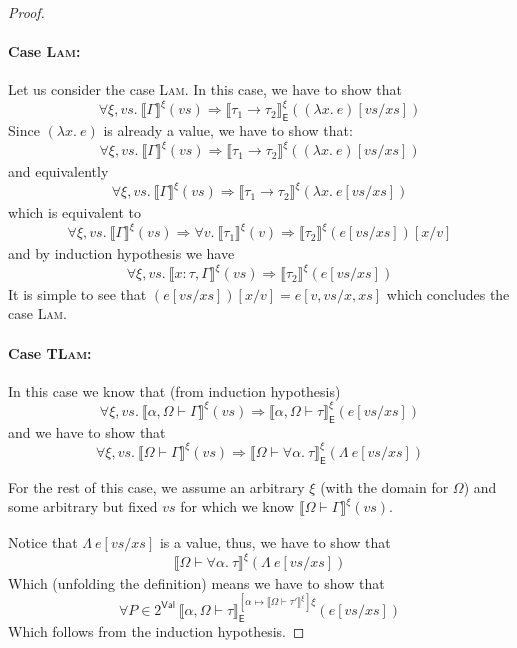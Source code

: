 \documentclass{article}
\newcommand{\EXP}{\mathsf{E}}
\newcommand{\VAL}{\mathsf{Val}}
\newcommand{\semtyp}[2]{\llbracket #2 \rrbracket_{#1}}
\begin{document}
\begin{proof}
\paragraph{Case \textsc{Lam}:}
Let us consider the case \textsc{Lam}. In this case, we have to show that
\[
\forall \xi, \mathit{vs}. ~\semtyp{}{\Gamma}^{\xi}(\mathit{vs}) \Rightarrow
\semtyp{\EXP}{\tau_1 \to \tau_2}^{\xi}((\lambda x.~e)[\mathit{vs}/\mathit{xs}])
\]
Since $(\lambda x.~e)$ is already a value, we have to show that:
\[
\forall \xi, \mathit{vs}. ~\semtyp{}{\Gamma}^{\xi}(\mathit{vs}) \Rightarrow
\semtyp{}{\tau_1 \to \tau_2}^{\xi}((\lambda x.~e)[\mathit{vs}/\mathit{xs}])
\]
and equivalently
\[
\forall \xi, \mathit{vs}. ~\semtyp{}{\Gamma}^{\xi}(\mathit{vs}) \Rightarrow
\semtyp{}{\tau_1 \to \tau_2}^{\xi}(\lambda x.~e[\mathit{vs}/\mathit{xs}])
\]
which is equivalent to 
\[
\forall \xi, \mathit{vs}. ~\semtyp{}{\Gamma}^{\xi}(\mathit{vs}) \Rightarrow
\forall v.~\semtyp{}{\tau_1}^{\xi}(v) \Rightarrow \semtyp{}{\tau_2}^{\xi}(e[\mathit{vs}/\mathit{xs}])[x/v]
\]
and by induction hypothesis we have
\[
\forall \xi, \mathit{vs}. ~\semtyp{}{x : \tau, \Gamma}^{\xi}(\mathit{vs}) \Rightarrow
\semtyp{}{\tau_2}^{\xi}(e[\mathit{vs}/\mathit{xs}])
\]
It is simple to see that $(e[\mathit{vs}/\mathit{xs}])[x/v] = e[v, \mathit{vs}/x, \mathit{xs}]$
which concludes the case \textsc{Lam}.

\paragraph{Case \textsc{TLam}:}
In this case we know that (from induction hypothesis)
\[
\forall \xi, \mathit{vs}.~\semtyp{}{\alpha, \Omega \vdash \Gamma}^{\xi}(\mathit{vs}) \Rightarrow \semtyp{\EXP}
{\alpha, \Omega \vdash \tau}^{\xi}(e[\mathit{vs}/\mathit{xs}])
\]
and we have to show that
\[
\forall \xi, \mathit{vs}.~\semtyp{}{\Omega \vdash \Gamma}^{\xi}(\mathit{vs}) \Rightarrow \semtyp{\EXP}
{\Omega \vdash \forall \alpha.~\tau}^{\xi}(\Lambda~e[\mathit{vs}/\mathit{xs}])
\]

For the rest of this case, we assume an arbitrary $\xi$ (with the domain for $\Omega$) and
some arbitrary but fixed $\mathit{vs}$ for which we know
$\semtyp{}{\Omega \vdash \Gamma}^{\xi}(\mathit{vs})$.

Notice that $\Lambda~e[\mathit{vs}/\mathit{xs}]$ is a value,
thus, we have to show that
\[
\semtyp{} {\Omega \vdash \forall \alpha.~\tau}^{\xi}(\Lambda~e[\mathit{vs}/\mathit{xs}])
\]
Which (unfolding the definition) means we have to show that
\[
\forall P \in 2^{\VAL}~\semtyp{\EXP}
{\alpha, \Omega \vdash \tau}
^{[\alpha \mapsto  \semtyp{} {\Omega \vdash \tau'}^{\xi}]\xi}(e[\mathit{vs}/\mathit{xs}])
\]
Which follows from the induction hypothesis.
\end{proof}
\end{document}
